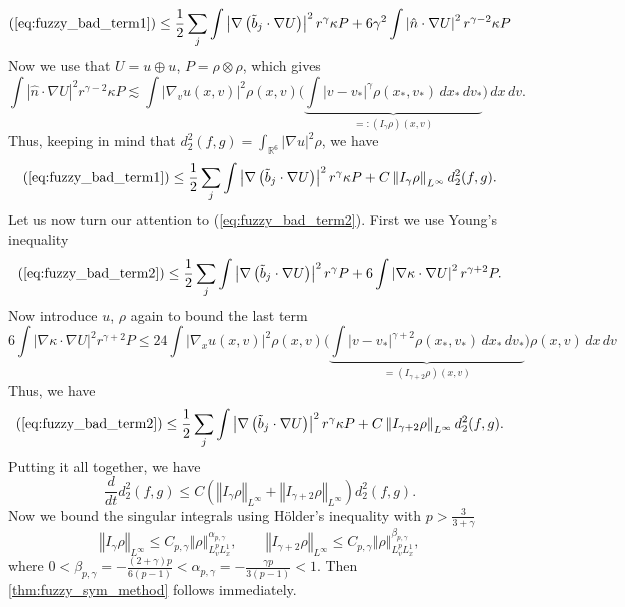 \documentclass[10pt,oneside]{amsart}
\numberwithin{equation}{section}
\numberwithin{definition}{section}
\numberwithin{theorem}{section}
\numberwithin{lemma}{section}
\begin{document}
%
\begin{equation*}
  (\ref{eq:fuzzy_bad_term1}) \leq
  \frac{1}{2}\sum_{j}\int\left|\nabla\left(\tilde{b}_{j}\cdot\nabla U\right)\right|^{2}r^{\gamma}\kappa P
    +6\gamma^{2}\int\left|\hat{n}\cdot\nabla U\right|^{2}r^{\gamma-2}\kappa P
\end{equation*}
%
Now we use that $U = u\oplus u$, $P = \rho \otimes \rho$, which gives
%
\begin{equation*}
  \int\left|\hat{n}\cdot\nabla U\right|^{2}r^{\gamma-2}\kappa P \lesssim
  \int\left|\nabla_{v}u(x,v)\right|^{2}\rho(x,v)\Bigg(\underbrace{\int|v-v_*|^{\gamma}\rho(x_*,v_*)\,dx_*\,dv_*}_{=:(I_{\gamma}\rho)(x,v)}\Bigg)\,dx\,dv.
\end{equation*}
%
%
Thus, keeping in mind that $d_2^2(f,g)=\int_{\mathbb R^6}|\nabla u|^2\rho$, we have
%
\begin{equation*}
  (\ref{eq:fuzzy_bad_term1})\leq\frac{1}{2}\sum_{j}\int\left|\nabla\left(\tilde{b}_{j}\cdot\nabla U\right)\right|^{2}r^{\gamma}\kappa P+
  C\left\Vert I_{\gamma}\rho\right\Vert _{L^{\infty}} d_2^2(f,g).
\end{equation*}
%
Let us now turn our attention to (\ref{eq:fuzzy_bad_term2}). First we use Young's inequality
%
\begin{equation*}
  (\ref{eq:fuzzy_bad_term2}) \leq\frac{1}{2}\sum_{j}\int\left|\nabla\left(\tilde{b}_{j}\cdot\nabla U\right)\right|^{2}r^{\gamma}P
    +6\int\left|\nabla\kappa\cdot\nabla U\right|^{2}r^{\gamma+2}P.
\end{equation*}
%
Now introduce $u$, $\rho$ again to bound the last term
%
\begin{equation*}
  6\int\left|\nabla\kappa\cdot\nabla U\right|^{2}r^{\gamma+2}P\leq
  24\int\left|\nabla_{x}u(x,v)\right|^{2}\rho(x,v)\Bigg(\underbrace{\int|v-v_*|^{\gamma+2}\rho(x_*,v_*)\,dx_*\,dv_*}_{=(I_{\gamma+2}\rho)(x,v)}\Bigg)\rho(x,v)\,dx\,dv
\end{equation*}
%
Thus, we have
\begin{equation*}
  (\ref{eq:fuzzy_bad_term2}) \leq 
  \frac{1}{2}\sum_{j}\int\left|\nabla\left(\tilde{b}_{j}\cdot\nabla U\right)\right|^{2}r^{\gamma}\kappa P
  +C\left\Vert I_{\gamma+2}\rho\right\Vert _{L^{\infty}}d_2^2(f,g).
\end{equation*}
%
Putting it all together, we have
%
\begin{equation*}
  \frac{d}{dt}d_{2}^{2}(f,g)\le C\left(\left\Vert I_{\gamma}\rho\right\Vert _{L^{\infty}}+\left\Vert I_{\gamma+2}\rho\right\Vert _{L^{\infty}}\right)d_{2}^{2}(f,g).
\end{equation*}
%
Now we bound the singular integrals using Hölder's inequality with $p>\frac{3}{3+\gamma}$
%
\begin{equation*}
  \left\Vert I_{\gamma}\rho\right\Vert _{L^{\infty}}\leq 
    C_{p,\gamma}\left\Vert \rho\right\Vert _{L^{p}_vL^1_x}^{\alpha_{p,\gamma}},\qquad
    \left\Vert I_{\gamma+2}\rho\right\Vert_{L^{\infty}}\le C_{p,\gamma}\left\Vert \rho\right\Vert _{L^{p}_vL^1_x}^{\beta_{p,\gamma}},
\end{equation*}
%
where $0<\beta_{p,\gamma}=-\frac{(2+\gamma)p}{6(p-1)} < \alpha_{p,\gamma}=-\frac{\gamma p}{3(p-1)} <1$. Then \cref{thm:fuzzy_sym_method} follows immediately.
\end{document}
